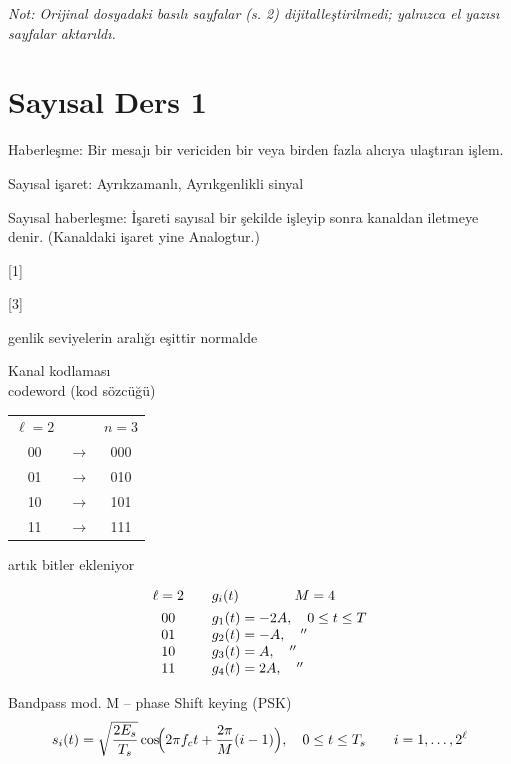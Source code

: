 \documentclass[11pt,a4paper]{article}
\begin{document}
\textit{Not: Orijinal dosyadaki basılı sayfalar (s. 2) dijitalleştirilmedi; yalnızca el yazısı sayfalar aktarıldı.}

\section{Sayısal Ders 1}
\noindent Haberleşme: Bir mesajı bir vericiden bir veya birden fazla alıcıya ulaştıran işlem.

\noindent Sayısal işaret: Ayrıkzamanlı, Ayrıkgenlikli sinyal

\noindent Sayısal haberleşme: İşareti sayısal bir şekilde işleyip sonra kanaldan iletmeye denir. (Kanaldaki işaret yine Analogtur.)

[1]

[3]

\noindent genlik seviyelerin aralığı eşittir normalde

\noindent Kanal kodlaması\\
codeword (kod sözcüğü)

\begin{center}
\begin{tabular}{@{}c@{\quad}c@{\quad}c@{}}
\underline{$\ell=2$} & & \underline{$n=3$}\\[3pt]
00 & $\longrightarrow$ & 000\\
01 & $\longrightarrow$ & 010\\
10 & $\longrightarrow$ & 101\\
11 & $\longrightarrow$ & 111
\end{tabular}
\end{center}
\noindent artık bitler ekleniyor

\[
\begin{array}{c@{\qquad}l}
\ell=2 & g_i(t) \qquad\qquad M=4\\[4pt]
00 & g_1(t) = -2A, \quad 0\le t\le T\\
01 & g_2(t) = -A, \quad ''\\
10 & g_3(t) = A, \quad ''\\
11 & g_4(t) = 2A, \quad ''
\end{array}
\]

\noindent Bandpass mod. M -- phase Shift keying (PSK)
\[ s_i(t) = \sqrt{\frac{2E_s}{T_s}}\cos\!\Bigl(2\pi f_c t + \frac{2\pi}{M}(i-1)\Bigr),\quad 0\le t\le T_s \qquad i=1,\dots,2^{\ell} \]
\end{document}
